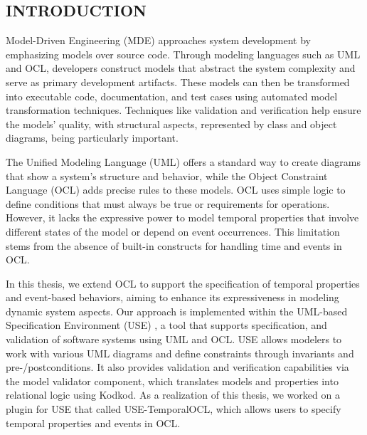 \setcounter{page}{1}


\setlength{\parindent}{1cm}

\begin{center}
  \section*{INTRODUCTION}
\end{center}


\hspace{\parindent}Model-Driven Engineering (MDE) \cite{MDE} approaches system development 
by emphasizing models over source code. Through modeling languages such as UML 
and OCL, developers construct models that abstract the system complexity and serve as primary development artifacts. 
These models can then be transformed into executable code, documentation, and test cases using automated 
model transformation techniques. Techniques like validation and verification help 
ensure the models’ quality, with structural aspects, represented by class and object 
diagrams, being particularly important.

The Unified Modeling Language (UML) offers a standard way to create diagrams that show 
a system’s structure and behavior, while the Object Constraint Language (OCL) adds precise 
rules to these models. OCL uses simple logic to define conditions that must always be true 
or requirements for operations. However, it lacks the expressive power to model temporal properties 
that involve different states of the model or depend on event occurrences. 
This limitation stems from the absence of built-in constructs for handling time and events in OCL.


In this thesis, we extend OCL to support the specification of temporal properties and 
event-based behaviors, aiming to enhance its expressiveness in modeling dynamic system 
aspects. Our approach is implemented within the UML-based Specification Environment (USE) \cite{USE}, 
a tool that supports specification, and validation of software systems using UML and OCL. 
USE allows modelers to work with various UML diagrams and define constraints through invariants and 
pre-/postconditions. It also provides validation and verification capabilities via the model 
validator component, which translates models and properties into relational logic using Kodkod. 
As a realization of this thesis, we worked on a plugin for USE that called USE-TemporalOCL, 
which allows users to specify temporal properties and events in OCL.

